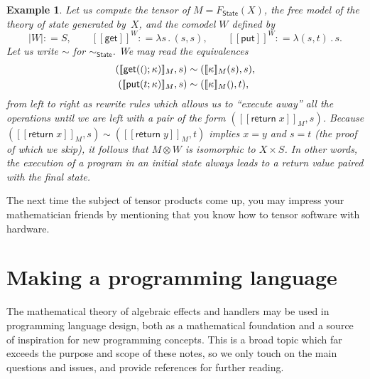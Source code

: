 \documentclass{amsart}
\newcommand{\theory}[1]{\mathsf{#1}} %
\newcommand{\Free}[2]{F_{\theory{#1}}(#2)} %
\newcommand{\lam}[1]{\lambda #1 \,.\,}
\newcommand{\unit}{{\text{\small$()$}}} %
\newcommand{\sem}[1]{[\![#1]\!]} %
\newcommand{\defeq}{\mathbin{{:}{=}}} %
\newcommand{\tensor}[2]{#1 \otimes #2} %
\newcommand{\kode}[1]{\mathsf{#1}}
\newcommand{\opcall}[3]{\kode{#1}(#2; #3)}
\newcommand{\return}[1]{\kode{return}\;#1}
\newtheorem{example}[definition]{Example}
\begin{document}
\begin{example}
  Let us compute the tensor of $M = \Free{\theory{State}}{X}$, the free model of
  the theory of state generated by~$X$, and the comodel $W$ defined by
  \begin{equation*}
    |W| \defeq S,
    \qquad
    \sem{\kode{get}}^W \defeq \lam{s} (s, s),
    \qquad
    \sem{\kode{put}}^W \defeq \lam{(s,t)} s.
  \end{equation*}
  Let us write $\sim$ for $\sim_{\theory{State}}$.
  We may read the equivalences
  \begin{align*}
    (\sem{\opcall{get}{\unit}{\kappa}}_M, s) &\sim (\sem{\kappa}_M (s), s), \\
    (\sem{\opcall{put}{t}{\kappa}}_M, s) &\sim (\sem{\kappa}_M \unit, t),
  \end{align*}
  from left to right as rewrite rules which allows us to ``execute away'' all the
  operations until we are left with a pair of the form $(\sem{\return{x}}_M, s)$.
  Because $(\sem{\return{x}}_M, s) \sim (\sem{\return{y}}_M, t)$ implies $x = y$
  and $s = t$ (the proof of which we skip), it follows that $\tensor{M}{W}$ is
  isomorphic to $X \times S$. In other words, the execution of a program in an
  initial state always leads to a return value paired with the final state.
\end{example}

The next time the subject of tensor products come up, you may impress your
mathematician friends by mentioning that you know how to tensor software with
hardware.


\section{Making a programming language}
\label{sec:making-progr-lang}


The mathematical theory of algebraic effects and handlers may be used in
programming language design, both as a mathematical foundation and a source of
inspiration for new programming concepts. This is a broad topic which far
exceeds the purpose and scope of these notes, so we only touch on the main
questions and issues, and provide references for further reading.
\end{document}
